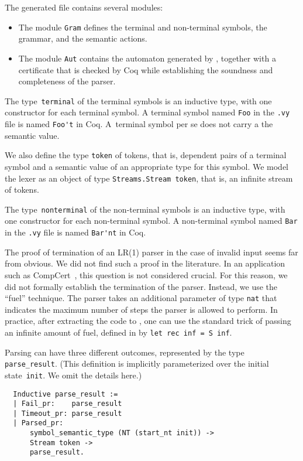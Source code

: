\documentclass[onecolumn,11pt,nocopyrightspace,preprint]{sigplanconf}
\begin{document}
The generated file contains several modules:

\begin{itemize}
\item The module \verb+Gram+ defines the terminal and
  non-terminal symbols, the grammar, and the semantic actions.
\item The module \verb+Aut+ contains the automaton
  generated by \menhir, together with a certificate that is checked by Coq
  while establishing the soundness and completeness of the parser.
\end{itemize}

The type~\verb+terminal+ of the terminal symbols is an inductive type, with
one constructor for each terminal symbol. A terminal symbol named \verb+Foo+
in the \verb+.vy+ file is named \verb+Foo't+ in Coq. A~terminal symbol per se
does not carry a the semantic value.

We also define the type \verb+token+ of tokens, that is, dependent pairs of a
terminal symbol and a semantic value of an appropriate type for this symbol.
We model the lexer as an object of type \verb+Streams.Stream token+, that is,
an infinite stream of tokens.

The type~\verb+nonterminal+ of the non-terminal symbols is an inductive type,
with one constructor for each non-terminal symbol. A non-terminal symbol named
\verb+Bar+ in the \verb+.vy+ file is named \verb+Bar'nt+ in Coq.

The proof of termination of an LR(1) parser in the case of invalid input seems
far from obvious. We did not find such a proof in the literature. In an
application such as CompCert~\cite{compcert}, this question is not considered
crucial. For this reason, we did not formally establish the termination of the
parser. Instead, we use the ``fuel'' technique. The parser takes an additional
parameter of type \verb+nat+ that indicates the maximum number of steps the
parser is allowed to perform. In practice, after extracting the code to
\ocaml, one can use the standard trick of passing an infinite amount of fuel,
defined in \ocaml by \verb+let rec inf = S inf+.

Parsing can have three different outcomes, represented by the type
\verb+parse_result+.
%
(This definition is implicitly parameterized over the initial
state~\verb+init+. We omit the details here.)
%
\begin{verbatim}
  Inductive parse_result :=
  | Fail_pr:    parse_result
  | Timeout_pr: parse_result
  | Parsed_pr:
      symbol_semantic_type (NT (start_nt init)) ->
      Stream token ->
      parse_result.
\end{verbatim}
\end{document}
